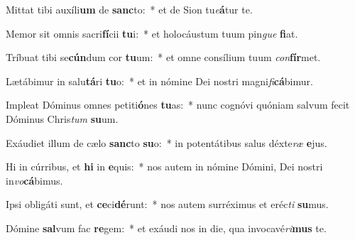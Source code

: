 \item Mittat tibi auxíli\textbf{um} de \textbf{sanc}to:~* et de Sion tu\textit{e}\textbf{á}tur te.
\item Memor sit omnis sacri\textbf{fí}cii \textbf{tu}i:~* et holocáustum tuum pin\textit{gue} \textbf{fi}at.
\item Tríbuat tibi se\textbf{cún}dum cor \textbf{tu}um:~* et omne consílium tuum \textit{con}\textbf{fír}met.
\item Lætábimur in salu\textbf{tá}ri \textbf{tu}o:~* et in nómine Dei nostri magni\textit{fi}\textbf{cá}bimur.
\item Impleat Dóminus omnes petiti\textbf{ó}nes \textbf{tu}as:~* nunc cognóvi quóniam salvum fecit Dóminus Chris\textit{tum} \textbf{su}um.
\item Exáudiet illum de cælo \textbf{sanc}to \textbf{su}o:~* in potentátibus salus déxte\textit{ræ} \textbf{e}jus.
\item Hi in cúrribus, et \textbf{hi} in \textbf{e}quis:~* nos autem in nómine Dómini, Dei nostri in\textit{vo}\textbf{cá}bimus.
\item Ipsi obligáti sunt, et \textbf{ce}ci\textbf{dé}runt:~* nos autem surréximus et eréc\textit{ti} \textbf{su}mus.
\item Dómine \textbf{sal}vum fac \textbf{re}gem:~* et exáudi nos in die, qua invocavé\textit{ri}\textbf{mus} te.
